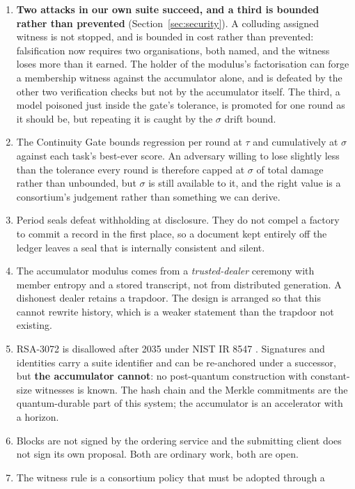 \documentclass[11pt,a4paper]{article}
\begin{document}
\begin{enumerate}[leftmargin=1.4em,itemsep=0.15em]
\item \textbf{Two attacks in our own suite succeed, and a third is bounded
rather than prevented} (Section~\ref{sec:security}). A colluding assigned witness
is not stopped, and is bounded in cost rather than prevented: falsification now
requires two organisations, both named, and the witness loses more than it earned.
The holder of the modulus's factorisation can forge a membership witness against
the accumulator alone, and is defeated by the other two verification checks but
not by the accumulator itself. The third, a model poisoned just inside the gate's
tolerance, is promoted for one round as it should be, but repeating it is caught
by the $\sigma$ drift bound.
\item The Continuity Gate bounds regression per round at $\tau$ and cumulatively
at $\sigma$ against each task's best-ever score. An adversary willing to lose
slightly less than the tolerance every round is therefore capped at $\sigma$ of
total damage rather than unbounded, but $\sigma$ is still available to it, and
the right value is a consortium's judgement rather than something we can derive.
\item Period seals defeat withholding at disclosure. They do not compel a factory
to commit a record in the first place, so a document kept entirely off the ledger
leaves a seal that is internally consistent and silent.
\item The accumulator modulus comes from a \emph{trusted-dealer} ceremony with
member entropy and a stored transcript, not from distributed generation. A
dishonest dealer retains a trapdoor. The design is arranged so that this cannot
rewrite history, which is a weaker statement than the trapdoor not existing.
\item RSA-3072 is disallowed after 2035 under NIST IR 8547 \citep{nist2024ir8547}. Signatures and
identities carry a suite identifier and can be re-anchored under a successor, but
\textbf{the accumulator cannot}: no post-quantum construction with constant-size
witnesses is known. The hash chain and the Merkle commitments are the
quantum-durable part of this system; the accumulator is an accelerator with a
horizon.
\item Blocks are not signed by the ordering service and the submitting client does
not sign its own proposal. Both are ordinary work, both are open.
\item The witness rule is a consortium policy that must be adopted through a

\end{enumerate}
\end{document}

